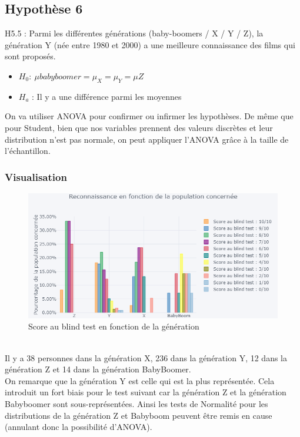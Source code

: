 \documentclass{article} %
\begin{document}
\subsection{ Hypothèse 6}
H5.5 : Parmi les différentes générations (baby-boomers / X / Y / Z), la génération Y (née entre 1980 et 2000) a une meilleure connaissance des films qui sont proposés.
\begin{itemize}
	\item $H_0: \ \mu{babyboomer} = \mu_{X} = \mu_{Y} = \mu{Z}$
	\item $H_a$ : Il y a une différence parmi les moyennes
\end{itemize}
On va utiliser ANOVA pour confirmer ou infirmer les hypothèses. De même que pour Student, bien que nos variables prennent des valeurs discrètes et leur distribution n'est pas normale, on peut appliquer l'ANOVA grâce à la taille de l'échantillon.
\newpage
\subsubsection{Visualisation}
\begin{figure}[!h]
	\includegraphics[keepaspectratio,scale=0.9]{h6.png}
	\caption{Score au blind test en fonction de la génération}
\end{figure}~\\
Il y a 38 personnes dans la génération X, 236 dans la génération Y, 12 dans la génération Z et 14 dans la génération BabyBoomer.\\
On remarque que la génération Y est celle qui est la plus représentée. Cela introduit un fort biais pour le test suivant car la génération Z et la génération Babyboomer sont sous-représentées. Ainsi les tests de Normalité pour les distributions de la génération Z et Babyboom peuvent être remis en cause (annulant donc la possibilité d'ANOVA).\\
\end{document}
